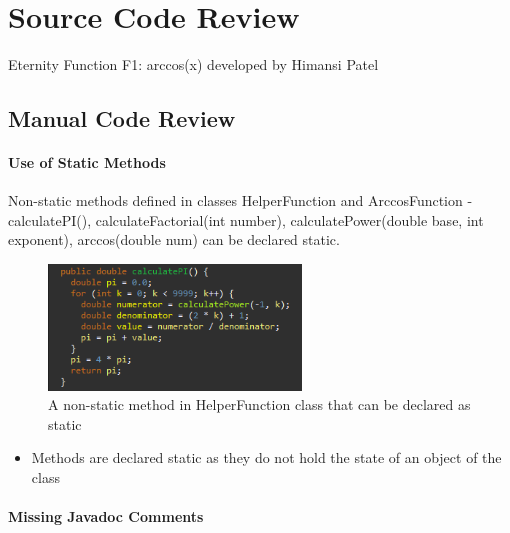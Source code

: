 \documentclass[11pt, english]{report}
\begin{document}
\newcommand{\CC}{C\nolinebreak\hspace{-.05em}\raisebox{.4ex}{\tiny\bf +}\nolinebreak\hspace{-.10em}\raisebox{.4ex}{\tiny\bf +}}
\def\CC{{C\nolinebreak[4]\hspace{-.05em}\raisebox{.4ex}{\tiny\bf ++}}}

\tableofcontents
\newpage
\chapter{Source Code Review}

Eternity Function F1: arccos(x)  developed by Himansi Patel

\section{Manual Code Review}

\subsubsection{Use of Static Methods}

Non-static methods\cite{codereview1} defined in classes HelperFunction and ArccosFunction - calculatePI(), calculateFactorial(int number), calculatePower(double base, int exponent), arccos(double num) can be declared static.

\begin{figure}[H]
  
  \includegraphics[width=0.6\textwidth]{codereview/staticmethod.PNG}
  \centering
  \caption{ A non-static method in HelperFunction class that can be declared as static
}
\end{figure}

\begin{itemize}
    \item Methods are declared static as they do not hold the state of an object of the class
\end{itemize}

\subsubsection{Missing Javadoc Comments}
\end{document}
